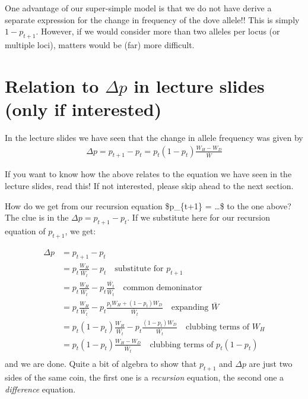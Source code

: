 \documentclass[
]{book}
\begin{document}
One advantage of our super-simple model is that we do not have derive a separate expression for the change in frequency of the dove allele!! This is simply \(1-p_{t+1}\). However, if we would consider more than two alleles per locus (or multiple loci), matters would be (far) more difficult.

\hypertarget{relation-to-delta-p-in-lecture-slides-only-if-interested}{%
\section{\texorpdfstring{Relation to \(\Delta p\) in lecture slides (only if interested)}{Relation to \textbackslash Delta p in lecture slides (only if interested)}}\label{relation-to-delta-p-in-lecture-slides-only-if-interested}}

In the lecture slides we have seen that the change in allele frequency was given by
\begin{align}
\Delta p = p_{t+1} - p_{t} = p_{t} \left ( 1 - p_{t} \right ) \frac{ W_{H} - W_{D}}{\bar{W}}
\end{align}

If you want to know how the above relates to the equation we have seen in the lecture slides, read this! If not interested, please skip ahead to the next section.

How do we get from our recursion equation \$p\_\{t+1\} = \ldots \$ to the one above?
The clue is in the \(\Delta p = p_{t+1} - p_{t}\). If we substitute here for our recursion equation of \(p_{t+1}\), we get:

\begin{align}
\Delta p &= p_{t+1} - p_{t} \\
&= p_{t}  \frac{W_{H}}{\bar{W}_{t}} - p_{t} \quad \text{substitute for }p_{t+1} \\
&= p_{t}  \frac{W_{H}}{\bar{W}_{t}} - p_{t} \frac{\bar{W_{t}}}{\bar{W}_{t}} \quad \text{common demoninator} \\
&= p_{t}  \frac{W_{H}}{\bar{W}_{t}} - p_{t} \frac{p_{t} W_{H} + \left (1  - p_{t}\right ) W_{D} }{\bar{W}_{t}} \quad \text{expanding }\bar{W} \\
&= p_{t} \left (1 - p_{t} \right )  \frac{W_{H}}{\bar{W}_{t}} - p_{t} \frac{\left (1  - p_{t}\right ) W_{D} }{\bar{W}_{t}} \quad \text{clubbing terms of }W_{H} \\
&= p_{t} \left (1 - p_{t} \right ) \frac{W_{H} - W_{D}}{\bar{W}_{t}} \quad \text{clubbing terms of }p_{t} \left(1-p_{t} \right) \\
\end{align}
and we are done. Quite a bit of algebra to show that \(p_{t+1}\) and \(\Delta p\) are just two sides of the same coin, the first one is a \emph{recursion} equation, the second one a \emph{difference} equation.
\end{document}
